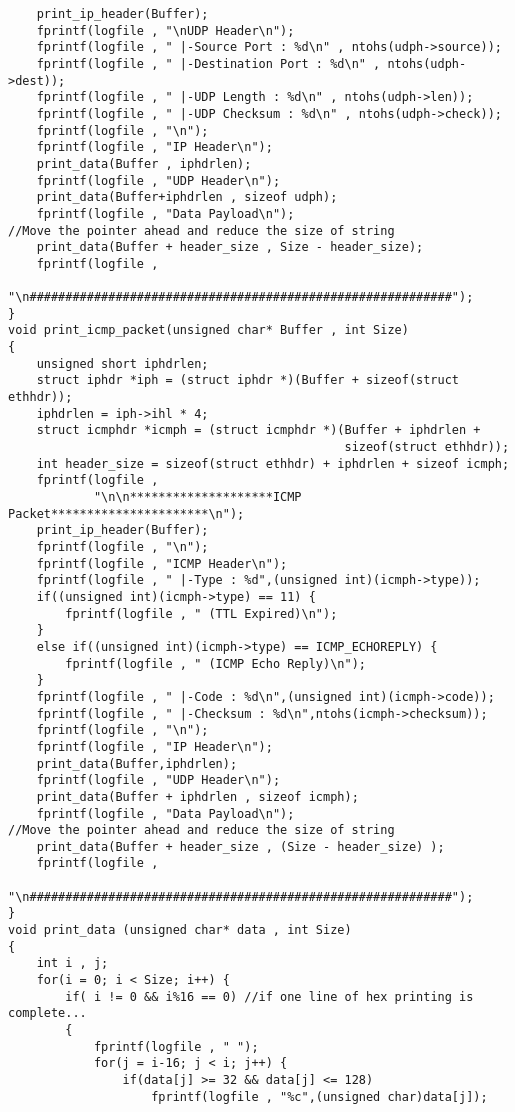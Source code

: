 \begin{verbatim}
    print_ip_header(Buffer);
    fprintf(logfile , "\nUDP Header\n");
    fprintf(logfile , " |-Source Port : %d\n" , ntohs(udph->source));
    fprintf(logfile , " |-Destination Port : %d\n" , ntohs(udph->dest));
    fprintf(logfile , " |-UDP Length : %d\n" , ntohs(udph->len));
    fprintf(logfile , " |-UDP Checksum : %d\n" , ntohs(udph->check));
    fprintf(logfile , "\n");
    fprintf(logfile , "IP Header\n");
    print_data(Buffer , iphdrlen);
    fprintf(logfile , "UDP Header\n");
    print_data(Buffer+iphdrlen , sizeof udph);
    fprintf(logfile , "Data Payload\n");
//Move the pointer ahead and reduce the size of string
    print_data(Buffer + header_size , Size - header_size);
    fprintf(logfile , 
            "\n###########################################################");
}
void print_icmp_packet(unsigned char* Buffer , int Size)
{
    unsigned short iphdrlen;
    struct iphdr *iph = (struct iphdr *)(Buffer + sizeof(struct ethhdr));
    iphdrlen = iph->ihl * 4;
    struct icmphdr *icmph = (struct icmphdr *)(Buffer + iphdrlen +
                                               sizeof(struct ethhdr));
    int header_size = sizeof(struct ethhdr) + iphdrlen + sizeof icmph;
    fprintf(logfile , 
            "\n\n********************ICMP Packet**********************\n");
    print_ip_header(Buffer);
    fprintf(logfile , "\n");
    fprintf(logfile , "ICMP Header\n");
    fprintf(logfile , " |-Type : %d",(unsigned int)(icmph->type));
    if((unsigned int)(icmph->type) == 11) {
        fprintf(logfile , " (TTL Expired)\n");
    }
    else if((unsigned int)(icmph->type) == ICMP_ECHOREPLY) {
        fprintf(logfile , " (ICMP Echo Reply)\n");
    }
    fprintf(logfile , " |-Code : %d\n",(unsigned int)(icmph->code));
    fprintf(logfile , " |-Checksum : %d\n",ntohs(icmph->checksum));
    fprintf(logfile , "\n");
    fprintf(logfile , "IP Header\n");
    print_data(Buffer,iphdrlen);
    fprintf(logfile , "UDP Header\n");
    print_data(Buffer + iphdrlen , sizeof icmph);
    fprintf(logfile , "Data Payload\n");
//Move the pointer ahead and reduce the size of string
    print_data(Buffer + header_size , (Size - header_size) );
    fprintf(logfile , 
            "\n###########################################################");
}
void print_data (unsigned char* data , int Size)
{
    int i , j;
    for(i = 0; i < Size; i++) {
        if( i != 0 && i%16 == 0) //if one line of hex printing is complete...
        {
            fprintf(logfile , " ");
            for(j = i-16; j < i; j++) {
                if(data[j] >= 32 && data[j] <= 128)
                    fprintf(logfile , "%c",(unsigned char)data[j]); 

\end{verbatim}
